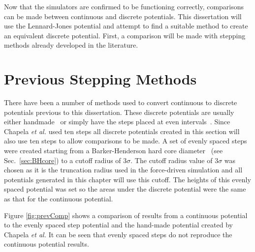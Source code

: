 \documentclass[12pt]{UoAthesis} \usepackage{booktabs}
\begin{document}
Now that the simulators are confirmed to be functioning correctly,
comparisons can be made between continuous and discrete potentials.
This dissertation will use the Lennard-Jones potential and attempt to
find a suitable method to create an equivalent discrete potential.
First, a comparison will be made with stepping methods already
developed in the literature.

\section{Previous Stepping Methods}
There have been a number of methods used to convert continuous to
discrete potentials previous to this dissertation.  These discrete
potentials are usually either handmade~\cite{Chapela1989, Unlu2004,
  ElliotJr2002} or simply have the steps placed at even
intervals~\cite{Chapela2010}.  Since Chapela \textit{et al.} used ten
steps all discrete potentials created in this section will also use
ten steps to allow comparisons to be made.  A set of evenly spaced
steps were created starting from a Barker-Henderson hard core
diameter~\cite{Barker1967a} (see Sec.~\ref{sec:BHcore}) to a cutoff
radius of $3\sigma$.  The cutoff radius value of $3\sigma$ was chosen
as it is the truncation radius used in the force-driven simulation and
all potentials generated in this chapter will use this cutoff.  The
heights of this evenly spaced potential was set so the areas under the
discrete potential were the same as that for the continuous potential.

Figure \ref{fig:prevComp} shows a comparison of results from a
continuous potential to the evenly spaced step potential and the
hand-made potential created by Chapela \textit{et al.}  It can be seen
that evenly spaced steps do not reproduce the continuous potential
results.  
\end{document}

